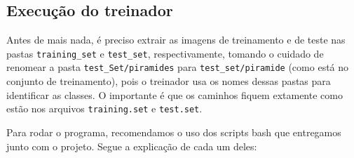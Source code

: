 \documentclass[a4paper,11pt]{article}
\begin{document}
  \subsection{Execução do treinador}

    Antes de mais nada, é preciso extrair as imagens de treinamento e de teste
    nas pastas \verb$training_set$ e \verb$test_set$, respectivamente, tomando o
    cuidado de renomear a pasta \verb$test_Set/piramides$ para
    \verb$test_set/piramide$ (como está no conjunto de treinamento), pois o
    treinador usa os nomes dessas pastas para identificar as classes. O
    importante é que os caminhos fiquem extamente como estão nos arquivos
    \verb$training.set$ e \verb$test.set$.

    Para rodar o programa, recomendamos o uso dos scripts bash que entregamos
    junto com o projeto. Segue a explicação de cada um deles:
\end{document}
